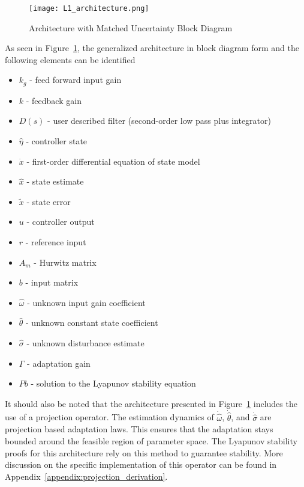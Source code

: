\begin{figure}[h!]
 \centering
  \texttt{[image: L1\_architecture.png]}
  \caption{\Lone Architecture with Matched Uncertainty Block Diagram \cite{hovakimyan2010l1} }
  \label{fig:l1_architecture}
\end{figure}

As seen in Figure~\ref{fig:l1_architecture}, the generalized \Lone architecture in block diagram form and the following elements can be identified
\begin{itemize}
 \item[] $k_g$ - feed forward input gain
 \item[] $k$ - feedback gain
 \item[] $D(s)$ - user described filter (second-order low pass plus integrator)
 \item[] $\hat{\eta}$ - \Lone controller state
 \item[] $\dot{x}$ - first-order differential equation of state model
 \item[] $\hat{x}$ - state estimate
 \item[] $\tilde{x}$ - state error
 \item[] $u$ - controller output
 \item[] $r$ - reference input
 \item[] $A_m$ - Hurwitz matrix
 \item[] $b$ - input matrix
 \item[] $\hat{\omega}$ - unknown input gain coefficient
 \item[] $\hat{\theta}$ - unknown constant state coefficient
 \item[] $\hat{\sigma}$ - unknown disturbance estimate
 \item[] $\Gamma$ - adaptation gain
 \item[] $Pb$ - solution to the Lyapunov stability equation 
\end{itemize}

It should also be noted that the architecture presented in Figure~\ref{fig:l1_architecture} includes the use of a projection operator.  The estimation dynamics of $\dot{\hat{\omega}}$, $\dot{\hat{\theta}}$, and $\dot{\hat{\sigma}}$ are projection based adaptation laws.  This ensures that the adaptation stays bounded around the feasible region of parameter space.  The Lyapunov stability proofs for this architecture rely on this method to guarantee stability\cite{hovakimyan2010l1}.  More discussion on the specific implementation of this operator can be found in Appendix~\ref{appendix:projection_derivation}.

